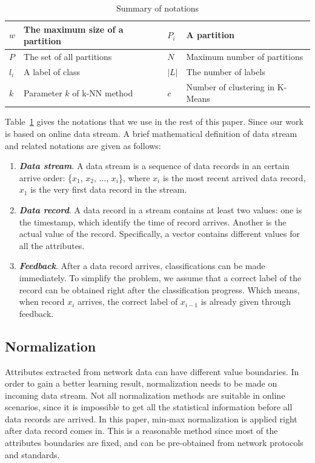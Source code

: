\documentclass[runningheads]{llncs}
\begin{document}
	
	\begin{table}
		\centering
		\caption{Summary of notations}\label{table:notation}
		\begin{tabular}{|m{1em}|m{16em}|m{1em}|m{16em}|}
			\hline
			$w$ & The maximum size of a partition & $P_i$ & A partition \\ 
			\hline
			$P$ & The set of all partitions & $N$ & Maximum number of partitions \\ 
			\hline
			$l_i$ & A label of class & $|L|$ & The number of labels  \\ 
			\hline
			$k$ & Parameter $k$ of k-NN method & $c$ & Number of clustering in K-Means \\
			\hline
		\end{tabular}
	\end{table}
	
	Table~\ref{table:notation} gives the notations that we use in the rest of this paper. Since our work is based on online data stream. A brief mathematical definition of data stream and related notations are given as follows:
	
	\begin{enumerate}
		\item \textbf{\textit{Data stream}}. A data stream is a sequence of data records in an certain arrive order: \big\{$x_1$, $x_2$, ..., $x_i$\big\}, where $x_i$ is the most recent arrived data record, $x_1$ is the very first data record in the stream.
		\item \textbf{\textit{Data record}}. A data record in a stream contains at least two values: one is the timestamp, which identify the time of record arrives. Another is the actual value of the record. Specifically, a vector contains different values for all the attributes.
		\item \textbf{\textit{Feedback}}. After a data record arrives, classifications can be made immediately. To simplify the problem, we assume that a correct label of the record can be obtained right after the classification progress. Which means, when record $x_i$ arrives, the correct label of $x_{i-1}$ is already given through feedback.
	\end{enumerate}
	
	\subsection{Normalization}
	Attributes extracted from network data can have different value boundaries. In order to gain a better learning result, normalization needs to be made on incoming data stream. Not all normalization methods are suitable in online scenarios, since it is impossible to get all the statistical information before all data records are arrived. In this paper, min-max normalization is applied right after data record comes in. This is a reasonable method since most of the attributes boundaries are fixed, and can be pre-obtained from network protocols and standards.
	
\end{document}
